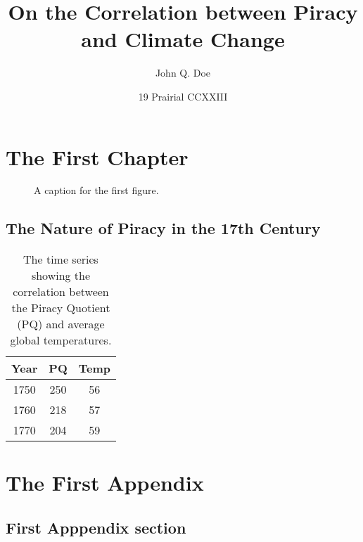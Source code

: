 \documentclass[endorse]{ukydissertation}
\title{On the Correlation between Piracy and Climate Change}
\author{John Q. Doe}
\date{19 Prairial CCXXIII}
\begin{document}
\makefrontmatter

\chapter{The First Chapter}
\lipsum[4-10]

\begin{figure}
  \centering
  \caption[A name for the ToC]{A caption for the first figure.}
  \label{fig:numberone}
\end{figure}

\section{The Nature of Piracy in the 17th Century}
\lipsum[11]
\begin{table}
  \caption[The Piracy-Temperature time series]%
  {The time series showing the correlation between the Piracy
    Quotient (PQ) and average global temperatures.}
  \label{tab:numberone}
  \centering
  \begin{tabular}{ccc}
    \hline
    Year & PQ & Temp\\
    \hline
    1750 & 250 & 56\\
    1760 & 218 & 57\\
    1770 & 204 & 59\\
    \hline
  \end{tabular}
\end{table}
\lipsum[12-15]

\backmatter
\chapter{The First Appendix}
\lipsum[16-17]

\section{First Apppendix section}
\lipsum[18-22]



\vita
\lipsum[23-25]
\end{document}
